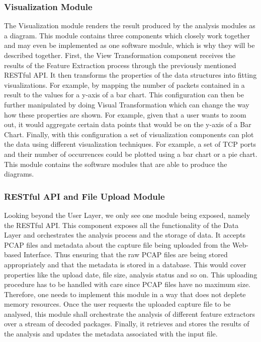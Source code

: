 \subsubsection{Visualization Module}
The Visualization module renders the result produced by the analysis modules as a diagram. This module contains three components which closely work together and may even be implemented as one software module, which is why they will be described together.
First, the View Transformation component receives the results of the Feature Extraction process through the previously mentioned RESTful API. It then transforms the properties of the data structures into fitting visualizations. For example, by mapping the number of packets contained in a result to the values for a y-axis of a bar chart.
This configuration can then be further manipulated by doing Visual Transformation which can change the way how these properties are shown. For example, given that a user wants to zoom out, it would aggregate certain data points that would be on the y-axis of a Bar Chart.
Finally, with this configuration a set of visualization components can plot the data using different visualization techniques. For example, a set of TCP ports and their number of occurrences could be plotted using a bar chart or a pie chart. This module contains the software modules that are able to produce the diagrams.

\subsubsection{RESTful API and File Upload Module}
Looking beyond the User Layer, we only see one module being exposed, namely the RESTful API. This component exposes all the functionality of the Data Layer and orchestrates the analysis process and the storage of data.
It accepts PCAP files and metadata about the capture file being uploaded from the Web-based Interface. Thus ensuring that the raw PCAP files are being stored appropriately and that the metadata is stored in a database. This would cover properties like the upload date, file size, analysis status and so on.
This uploading procedure has to be handled with care since PCAP files have no maximum size. Therefore, one needs to implement this module in a way that does not deplete memory resources.
Once the user requests the uploaded capture file to be analysed, this module shall orchestrate the analysis of different feature extractors over a stream of decoded packages. Finally, it retrieves and stores the results of the analysis and updates the metadata associated with the input file.

